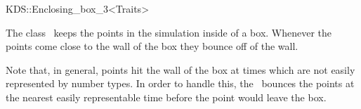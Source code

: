 

\begin{ccRefClass}{KDS::Enclosing_box_3<Traits>}  %


\ccDefinition
  
The class \ccRefName\ keeps the points in the simulation inside of a
box. Whenever the points come close to the wall of the box they bounce off of the wall.

Note that, in general, points hit the wall of the box at times which
are not easily represented by number types. In order to handle this,
the \ccRefName\ bounces the points at the nearest easily representable
time before the point would leave the box.


\ccTypes


\ccCreation
{}  %




\end{ccRefClass}


